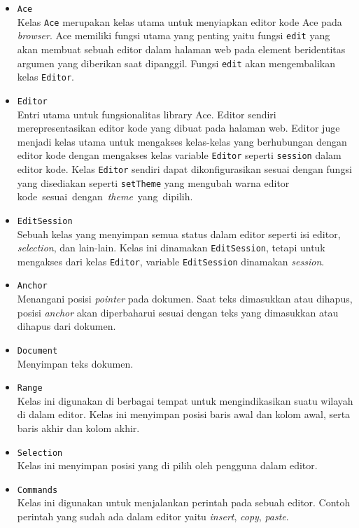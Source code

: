 \begin{itemize}
	\item \verb|Ace| \\
	      Kelas \verb|Ace| merupakan kelas utama untuk menyiapkan editor kode Ace pada \textit{browser}. Ace memiliki fungsi utama yang penting yaitu fungsi \verb|edit| yang akan membuat sebuah editor dalam halaman web pada element beridentitas argumen yang diberikan saat dipanggil. Fungsi \verb|edit| akan mengembalikan kelas \verb|Editor|.
	\item \verb|Editor| \\
	      Entri utama untuk fungsionalitas library Ace. Editor sendiri merepresentasikan editor kode yang dibuat pada halaman web. Editor juge menjadi kelas utama untuk mengakses kelas-kelas yang berhubungan dengan editor kode dengan mengakses kelas variable \verb|Editor| seperti \verb|session| dalam editor kode. Kelas \verb|Editor| sendiri dapat dikonfigurasikan sesuai dengan fungsi yang disediakan seperti \verb|setTheme| yang mengubah warna editor \mbox{kode sesuai dengan \textit{theme} yang dipilih.}
	\item \verb|EditSession| \\
	      Sebuah kelas yang menyimpan semua status dalam editor seperti isi editor, \textit{selection}, dan lain-lain. Kelas ini dinamakan \verb|EditSession|, tetapi untuk mengakses dari kelas \verb|Editor|, variable \verb|EditSession| dinamakan \textit{session}.
	\item \verb|Anchor| \\
	      Menangani posisi \textit{pointer} pada dokumen. Saat teks dimasukkan atau dihapus, posisi \textit{anchor} akan diperbaharui sesuai dengan teks yang dimasukkan atau dihapus dari dokumen.
	\item \verb|Document| \\
	      Menyimpan teks dokumen.
	\item \verb|Range| \\
	      Kelas ini digunakan di berbagai tempat untuk mengindikasikan suatu wilayah di dalam editor. Kelas ini menyimpan posisi baris awal dan kolom awal, serta baris akhir dan kolom akhir.
	\item \verb|Selection| \\
	      Kelas ini menyimpan posisi yang di pilih oleh pengguna dalam editor.
	\item \verb|Commands| \\
	      Kelas ini digunakan untuk menjalankan perintah pada sebuah editor. Contoh perintah yang sudah ada dalam editor yaitu \textit{insert}, \textit{copy}, \textit{paste}.
\end{itemize}

